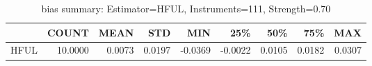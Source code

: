 \begin{table}[ht]
\centering
\caption{bias summary: Estimator=HFUL, Instruments=111, Strength=0.70}
\begin{tabular}{lrrrrrrrr}
\toprule
 & COUNT & MEAN & STD & MIN & 25\% & 50\% & 75\% & MAX \\
\midrule
HFUL & 10.0000 & 0.0073 & 0.0197 & -0.0369 & -0.0022 & 0.0105 & 0.0182 & 0.0307 \\
\bottomrule
\end{tabular}
\end{table}
